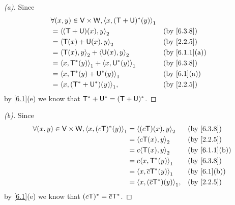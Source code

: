 \begin{proof}[(a)]
  Since
  \begin{align*}
     & \forall (x, y) \in \V \times \W, \inn{x, (\T + \U)^*(y)}_1                    \\
     & = \inn{(\T + \U)(x), y}_2                                  &  & \by{6.3.8}    \\
     & = \inn{\T(x) + \U(x), y}_2                                 &  & \by{2.2.5}    \\
     & = \inn{\T(x), y}_2 + \inn{\U(x), y}_2                      &  & \by{6.1.1}[a] \\
     & = \inn{x, \T^*(y)}_1 + \inn{x, \U^*(y)}_1                  &  & \by{6.3.8}    \\
     & = \inn{x, \T^*(y) + \U^*(y)}_1                             &  & \by{6.1}[a]   \\
     & = \inn{x, (\T^* + \U^*)(y)}_1,                             &  & \by{2.2.5}
  \end{align*}
  by \cref{6.1}(e) we know that \(\mathsf{T}^* + \mathsf{U}^* = (\mathsf{T} + \mathsf{U})^*\).
\end{proof}

\begin{proof}[(b)]
  Since
  \begin{align*}
    \forall (x, y) \in \V \times \W, \inn{x, (c \T)^*(y)}_1 & = \inn{(c \T)(x), y}_2           &  & \by{6.3.8}    \\
                                                            & = \inn{c \T(x), y}_2             &  & \by{2.2.5}    \\
                                                            & = c \inn{\T(x), y}_2             &  & \by{6.1.1}[b] \\
                                                            & = c \inn{x, \T^*(y)}_1           &  & \by{6.3.8}    \\
                                                            & = \inn{x, \conj{c} \T^*(y)}_1    &  & \by{6.1}[b]   \\
                                                            & = \inn{x, (\conj{c} \T^*)(y)}_1, &  & \by{2.2.5}
  \end{align*}
  by \cref{6.1}(e) we know that \((c \mathsf{T})^* = \overline{c} \mathsf{T}^*\).
\end{proof}

